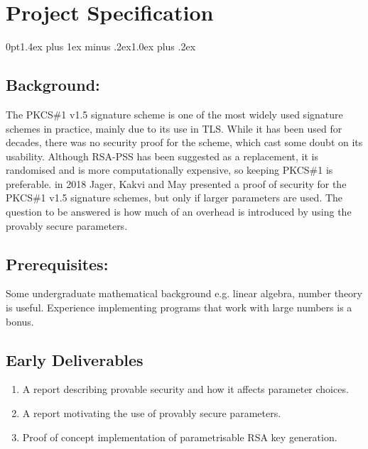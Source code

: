 \documentclass[]{final_report}
\theoremstyle{definition}
\begin{document}
\chapter*{Project Specification}
{
\titlespacing*{\section}
{0pt}{1.4ex plus 1ex minus .2ex}{1.0ex plus .2ex}

\section*{Background:}
The PKCS\#1 v1.5 signature scheme is one of the most widely used signature schemes in practice, mainly due to its use in TLS. While it has been used for decades, there was no security proof for the scheme, which cast some doubt on its usability. Although RSA-PSS has been suggested as a replacement, it is randomised and is more computationally expensive, so keeping PKCS\#1 is preferable. in 2018 Jager, Kakvi and May presented a proof of security for the PKCS\#1 v1.5 signature schemes, but only if larger parameters are used. The question to be answered is how much of an overhead is introduced by using the provably secure parameters.

\section*{Prerequisites:}
Some undergraduate mathematical background e.g. linear algebra, number theory is useful. Experience implementing programs that work with large numbers is a bonus.

\section*{Early Deliverables}
\begin{enumerate}
    \item A report describing provable security and how it affects parameter choices.
    \item A report motivating the use of provably secure parameters.
    \item Proof of concept implementation of parametrisable RSA key generation.
\end{enumerate}

}
\end{document}
